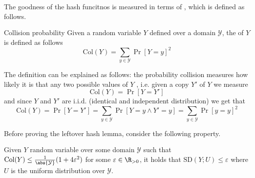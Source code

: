 \documentclass[a4paper, 12pt]{report}
\begin{document}
The goodness of the hash funcitnos is measured in terms of , which is defined as follows.

\begin{frameddefn}{Collision probability}
	Given a random variable $Y$ defined over a domain $\mathcal Y$, the  of $Y$ is defined as follows $$\mbox{Col}(Y) = \sum_{y \in \mathcal Y}{\Pr[Y = y]^2}$$
\end{frameddefn}

The definition can be explained as follows: the probability collision measures how likely it is that any two possible values of $Y$ , i.e. given a copy $Y'$ of $Y$ we measure $$\mbox{Col}(Y) = \Pr[Y = Y']$$ and since $Y$ and $Y'$ are i.i.d. (identical and independent distribution) we get that $$\mbox{Col}(Y) = \Pr[Y = Y'] = \sum_{y \in \mathcal Y}{\Pr[Y = y \land Y' = y]} = \sum_{y \in \mathcal Y}{\Pr[y = y]^2}$$

Before proving the leftover hash lemma, consider the following property.

\begin{framedprop}{}
	Given $Y$ random variable over some domain $\mathcal Y$ such that $\mbox{Col}(Y) \le \tfrac{1}{\abs{\mathcal Y}}(1 + 4 \varepsilon^2)$ for some $\varepsilon \in \R_{>0}$, it holds that $\mbox{SD}(Y;U) \le \varepsilon$ where $U$ is the uniform distribution over $\mathcal Y$.
\end{framedprop}
\end{document}
